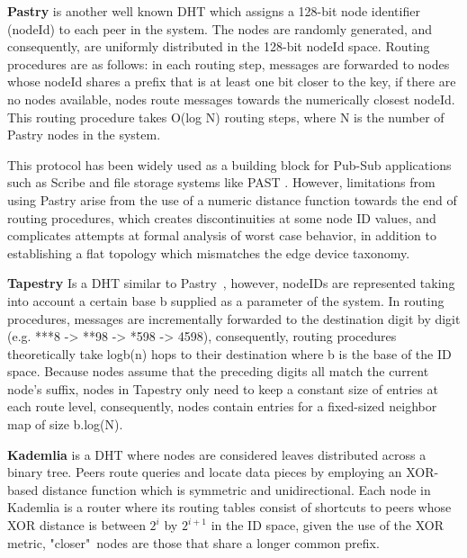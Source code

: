 

\textbf{Pastry} \cite{rowstron2001pastry} is another well known DHT which assigns a 128-bit node identifier (nodeId) to each peer in the system. The nodes are randomly generated, and consequently, are uniformly distributed in the 128-bit nodeId space. Routing procedures are as follows: in each routing step, messages are forwarded to nodes whose nodeId shares a prefix that is at least one bit closer to the key, if there are no nodes available, nodes route messages towards the numerically closest nodeId. This routing procedure takes O(log N) routing steps, where N is the number of Pastry nodes in the system. 

This protocol has been widely used as a building block for Pub-Sub applications such as Scribe \cite{10.1007/3-540-45546-9_3} and file storage systems like PAST \cite{990064}. However, limitations from using Pastry arise from the use of a numeric distance function towards the end of routing procedures, which creates discontinuities at some node ID values, and complicates attempts at formal analysis of worst case behavior, in addition to establishing a flat topology which mismatches the edge device taxonomy.

\textbf{Tapestry} \cite{tapestry} Is a DHT similar to Pastry~\cite{rowstron2001pastry}, however, nodeIDs are represented taking into account a certain base b supplied as a parameter of the system. In routing procedures,  messages are incrementally forwarded to the destination digit by digit (e.g. ***8 -> **98 -> *598 -> 4598), consequently, routing procedures theoretically take logb(n) hops to their destination where b is the base of the ID space. Because nodes assume that the preceding digits all match the current node's suffix, nodes in Tapestry only need to keep a constant size of entries at each route level, consequently, nodes contain entries for a fixed-sized neighbor map of size b.log(N).  

\textbf{Kademlia} \cite{maymounkov2002kademlia} is a DHT where nodes are considered leaves distributed across a binary tree. Peers route queries and locate data pieces by employing an XOR-based distance function which is symmetric and unidirectional. Each node in Kademlia is a router where its routing tables consist of shortcuts to peers whose XOR distance is between \(2^{i}\) by \(2^{i + 1}\) in the ID space, given the use of the XOR metric, "closer"\ nodes are those that share a longer common prefix.

